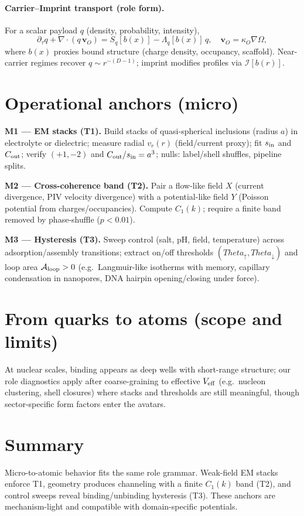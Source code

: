 \documentclass[12pt,a4paper,oneside]{scrreprt}
\def\Theta{Theta}%
\begin{document}
\paragraph{Carrier–Imprint transport (role form).}
For a scalar payload $q$ (density, probability, intensity),
\[
\partial_{\tau}q+\nabla\!\cdot(q\,\mathbf v_O)=S_q[b(x)]-\Lambda_q[b(x)]\,q,\quad \mathbf v_O=\kappa_O\nabla\Omega,
\]
where $b(x)$ proxies bound structure (charge density, occupancy, scaffold). Near-carrier regimes recover $q\!\sim\!r^{-(D-1)}$; imprint modifies profiles via $\mathcal I[b(r)]$.

\section{Operational anchors (micro)}\label{sec:micro-anchors}
\textbf{M1 — EM stacks (T1).} Build stacks of quasi-spherical inclusions (radius $a$) in electrolyte or dielectric; measure radial $v_r(r)$ (field/current proxy); fit $s_{\rm in}$ and $C_{\rm out}$; verify $(+1,-2)$ and $C_{\rm out}/s_{\rm in}=a^3$; nulls: label/shell shuffles, pipeline splits.

\textbf{M2 — Cross-coherence band (T2).} Pair a flow-like field $X$ (current divergence, PIV velocity divergence) with a potential-like field $Y$ (Poisson potential from charges/occupancies). Compute $C_1(k)$; require a finite band removed by phase-shuffle ($p<0.01$).

\textbf{M3 — Hysteresis (T3).} Sweep control (salt, pH, field, temperature) across adsorption/assembly transitions; extract on/off thresholds $(\Theta_\uparrow,\Theta_\downarrow)$ and loop area $\mathcal A_{\rm loop}>0$ (e.g.\ Langmuir-like isotherms with memory, capillary condensation in nanopores, DNA hairpin opening/closing under force).

\section{From quarks to atoms (scope and limits)}\label{sec:micro-scope}
At nuclear scales, binding appears as deep wells with short-range structure; our role diagnostics apply after coarse-graining to effective $V_{\rm eff}$ (e.g.\ nucleon clustering, shell closures) where stacks and thresholds are still meaningful, though sector-specific form factors enter the avatars.

\section*{Summary}
Micro-to-atomic behavior fits the same role grammar. Weak-field EM stacks enforce T1, geometry produces channeling with a finite $C_1(k)$ band (T2), and control sweeps reveal binding/unbinding hysteresis (T3). These anchors are mechanism-light and compatible with domain-specific potentials.
\end{document}
